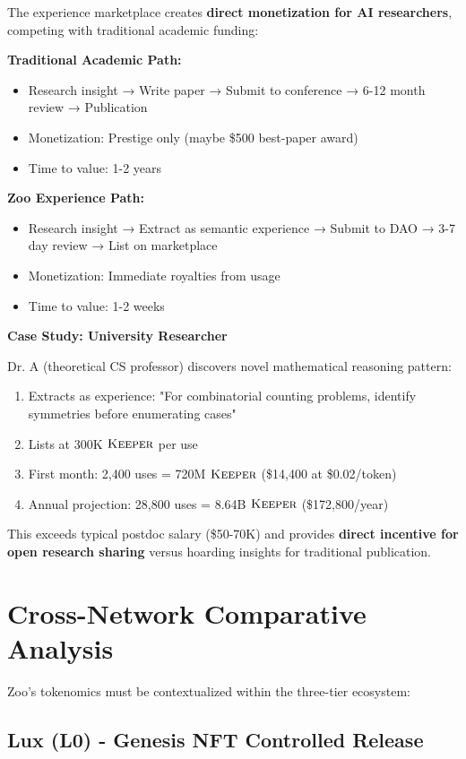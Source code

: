 \documentclass[11pt,letterpaper]{article}
\theoremstyle{definition}
\theoremstyle{remark}
\newcommand{\KEEPER}{\textsc{Keeper}}
\begin{document}
The experience marketplace creates \textbf{direct monetization for AI researchers}, competing with traditional academic funding:

\textbf{Traditional Academic Path:}
\begin{itemize}
\item Research insight → Write paper → Submit to conference → 6-12 month review → Publication
\item Monetization: Prestige only (maybe \$500 best-paper award)
\item Time to value: 1-2 years
\end{itemize}

\textbf{Zoo Experience Path:}
\begin{itemize}
\item Research insight → Extract as semantic experience → Submit to DAO → 3-7 day review → List on marketplace
\item Monetization: Immediate royalties from usage
\item Time to value: 1-2 weeks
\end{itemize}

\textbf{Case Study: University Researcher}

Dr. A (theoretical CS professor) discovers novel mathematical reasoning pattern:
\begin{enumerate}
\item Extracts as experience: "For combinatorial counting problems, identify symmetries before enumerating cases"
\item Lists at 300K $\KEEPER$ per use
\item First month: 2,400 uses = 720M $\KEEPER$ (\$14,400 at \$0.02/token)
\item Annual projection: 28,800 uses = 8.64B $\KEEPER$ (\$172,800/year)
\end{enumerate}

This exceeds typical postdoc salary (\$50-70K) and provides \textbf{direct incentive for open research sharing} versus hoarding insights for traditional publication.

\section{Cross-Network Comparative Analysis}

Zoo's tokenomics must be contextualized within the three-tier ecosystem:

\subsection{Lux (L0) - Genesis NFT Controlled Release}
\end{document}
